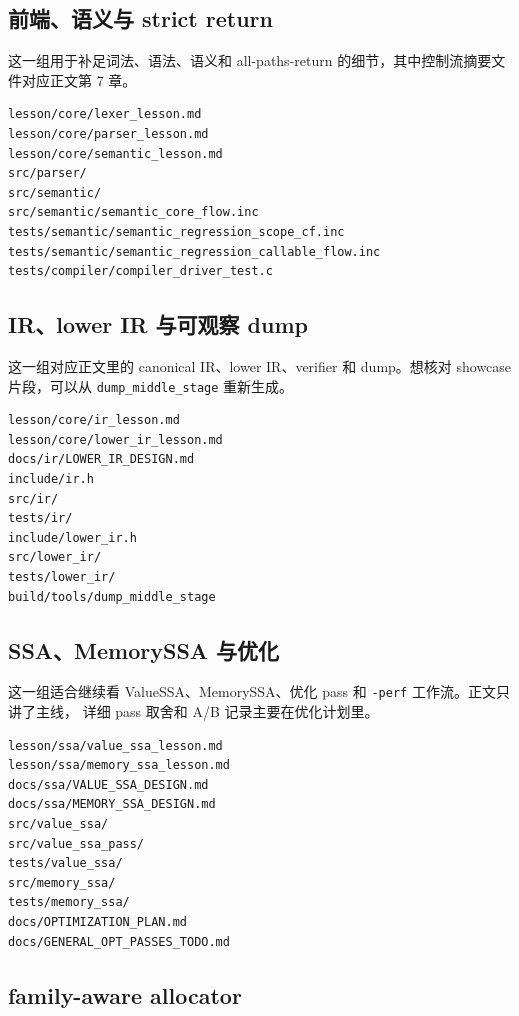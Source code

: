 \documentclass[UTF8,a4paper,11pt]{ctexart}
\begin{document}
\subsection{前端、语义与 strict return}

这一组用于补足词法、语法、语义和 all-paths-return 的细节，其中控制流摘要文件对应正文第 7 章。

\begin{lstlisting}[language={}]
lesson/core/lexer_lesson.md
lesson/core/parser_lesson.md
lesson/core/semantic_lesson.md
src/parser/
src/semantic/
src/semantic/semantic_core_flow.inc
tests/semantic/semantic_regression_scope_cf.inc
tests/semantic/semantic_regression_callable_flow.inc
tests/compiler/compiler_driver_test.c
\end{lstlisting}

\subsection{IR、lower IR 与可观察 dump}

这一组对应正文里的 canonical IR、lower IR、verifier 和 dump。想核对 showcase 片段，可以从
\texttt{dump\_middle\_stage} 重新生成。

\begin{lstlisting}[language={}]
lesson/core/ir_lesson.md
lesson/core/lower_ir_lesson.md
docs/ir/LOWER_IR_DESIGN.md
include/ir.h
src/ir/
tests/ir/
include/lower_ir.h
src/lower_ir/
tests/lower_ir/
build/tools/dump_middle_stage
\end{lstlisting}

\subsection{SSA、MemorySSA 与优化}

这一组适合继续看 ValueSSA、MemorySSA、优化 pass 和 \texttt{-perf} 工作流。正文只讲了主线，
详细 pass 取舍和 A/B 记录主要在优化计划里。

\begin{lstlisting}[language={}]
lesson/ssa/value_ssa_lesson.md
lesson/ssa/memory_ssa_lesson.md
docs/ssa/VALUE_SSA_DESIGN.md
docs/ssa/MEMORY_SSA_DESIGN.md
src/value_ssa/
src/value_ssa_pass/
tests/value_ssa/
src/memory_ssa/
tests/memory_ssa/
docs/OPTIMIZATION_PLAN.md
docs/GENERAL_OPT_PASSES_TODO.md
\end{lstlisting}

\subsection{family-aware allocator}
\end{document}
